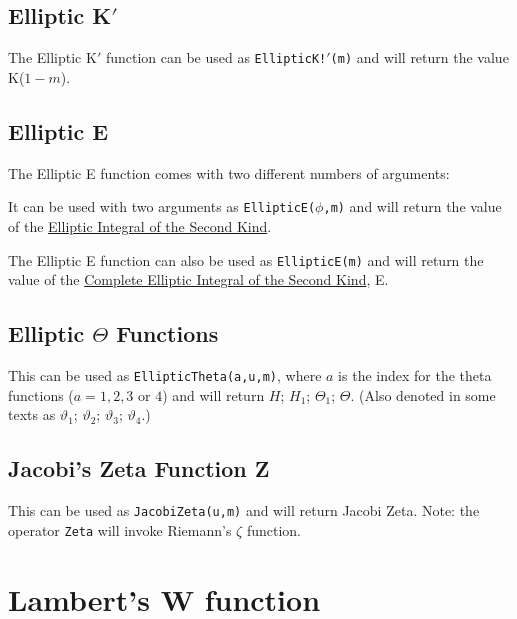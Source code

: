 \documentclass[11pt]{article}
\begin{document}
\subsection{Elliptic K$'$}

The Elliptic K$'$ function can be used as {\tt EllipticK!$'$(m)} and will 
return the value K($1-m$).

\subsection{Elliptic E}

The Elliptic E function comes with two different numbers of arguments:

It can be used with two arguments as {\tt EllipticE($\phi$,m)}
and will return the value
of the {\underline {Elliptic Integral of the Second Kind}}.

The Elliptic E function can also be used as {\tt EllipticE(m)} and 
will return the value of the {\underline {Complete Elliptic Integral 
of the Second Kind}}, E.

%
%
\subsection{Elliptic $\Theta$ Functions}

This can be used as {\tt EllipticTheta(a,u,m)}, where $a$ is the index 
for the theta functions ($a = 1,2,3$ or $4$) and will return $H$; 
$H_1$; $\Theta_1$; $\Theta$. (Also denoted in some texts as 
$\vartheta_1$; $\vartheta_2$; $\vartheta_3$; $\vartheta_4$.)

\subsection{Jacobi's Zeta Function Z }

This can be used as {\tt JacobiZeta(u,m)} and will return 
Jacobi Zeta. Note: the operator {\tt Zeta} will invoke Riemann's
$\zeta$ function.

\section{Lambert's W function}
\end{document}
